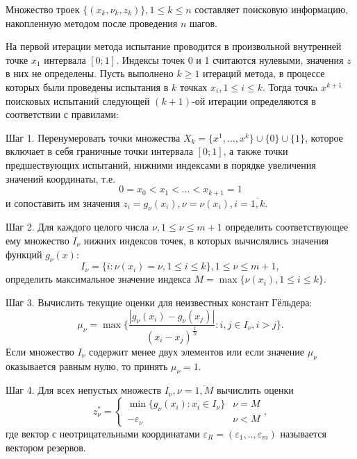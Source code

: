 Множество троек \(\{(x_k,\nu_k,z_k)\}, 1\leqslant k\leqslant n\) составляет поисковую информацию,
накопленную методом после проведения \(n\) шагов.

На первой итерации метода испытание проводится в произвольной внутренней точке \(x_1\)
интервала \([0;1]\). Индексы точек 0 и 1 считаются нулевыми, значения \(z\) в
них не определены. Пусть выполнено \(k\geqslant 1\) итераций метода,
в процессе которых были проведены испытания в \(k\) точках \(x_i, 1\leqslant i\leqslant k\).
Тогда точкa \(x^{k+1}\) поисковых испытаний следующей \((k+1)\)-ой
итерации определяются в соответствии с правилами:

Шаг 1. Перенумеровать точки множества \(X_k=\{x^1,\dotsc,x^k\}\cup\{0\}\cup\{1\}\),
которое включает в себя граничные точки интервала \([0;1]\), а также точки предшествующих
испытаний, нижними индексами в порядке увеличения значений координаты, т.е.
\begin{displaymath}
0=x_0<x_1<\dotsc<x_{k+1}=1
\end{displaymath}
и сопоставить им значения \(z_{i}=g_{\nu }(x_{i}),\nu =\nu (x_{i}),i={\overline {1,k}}\).

Шаг 2. Для каждого целого числа \(\nu ,1\leqslant \nu \leqslant m+1\) определить соответствующее
ему множество \(I_{\nu }\) нижних индексов точек, в которых вычислялись значения
функций \(g_{\nu }(x)\):
\begin{displaymath}
  I_{\nu }=\{i:\nu (x_{i})=\nu ,1\leqslant i\leqslant k\},1\leq \nu \leqslant m+1,
\end{displaymath}
определить максимальное значение индекса \(M=\max\{\nu (x_{i}),1\leq i\leq k\}\).

Шаг 3. Вычислить текущие оценки для неизвестных констант Гёльдера:
\begin{equation}
  \label{step2}
  \mu _{\nu }=\max\{\frac{|g_{\nu }(x_{i})-g_{\nu }(x_{j})|}{(x_{i}-x_{j})^{\frac{1}{N}}}:i,j\in I_{\nu },i>j\}.
\end{equation}
Если множество \(I_{\nu }\) содержит менее двух элементов или если значение \(\mu _{\nu }\)
оказывается равным нулю, то принять \(\mu _{\nu }=1\).

Шаг 4. Для всех непустых множеств \(I_{\nu },\nu ={\overline {1,M}}\) вычислить оценки
\begin{displaymath}
  z_{\nu }^{*}={\begin{cases}\min\{g_{\nu }(x_{i}):x_{i}\in I_{\nu }\}&\nu =M\\-\varepsilon _{\nu }&\nu <M\end{cases}},
\end{displaymath}
где вектор с неотрицательными координатами \(\varepsilon _{R}=(\varepsilon _{1},..,\varepsilon _{m})\) называется вектором резервов.

